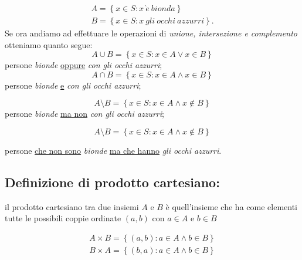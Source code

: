 \documentclass[a4paper]{article}
\begin{document}
	\begin{equation*}
		\begin{array}{l}
			A= \left\lbrace x\in S: x \ \grave e \ bionda \right\rbrace \\
			B= \left\lbrace x\in S: x \ gli \ occhi \ azzurri\right\rbrace.
		\end{array}
	\end{equation*}
Se ora andiamo ad effettuare le operazioni di \textit{unione, intersezione e complemento} otteniamo quanto segue:
\begin{equation*}
		A \cup B = \left\lbrace x \in S : x\in A \lor x \in B\right\rbrace 
\end{equation*}
persone \textit{bionde} \underline{oppure} \textit{con gli occhi azzurri};
\begin{equation*}
		A \cap B = \left\lbrace x \in S : x\in A \wedge x \in B\right\rbrace 
\end{equation*}
persone \textit{bionde} \underline{e} \textit{con gli occhi azzurri};

\begin{equation*}
			A \setminus B = \left\lbrace x \in S : x\in A \wedge x \notin B\right\rbrace 
\end{equation*}
persone \textit{bionde} \underline{ma non} \textit{con gli occhi azzurri};


\begin{equation*}
			A \setminus B = \left\lbrace x \in S : x\in A \wedge x \notin B\right\rbrace 
\end{equation*}

persone \underline{che non sono} \textit{bionde} \underline{ma che hanno} \textit{gli occhi azzurri}.

\subsection{Definizione di prodotto cartesiano:}
il prodotto cartesiano tra due insiemi $A$ e $B$ è quell'insieme che ha come elementi tutte le possibili coppie ordinate $(a,b)$ con $a\in A$ e $b\in B$ 

\begin{equation*}
			\begin{array}{l}
			A \times B=\left\lbrace (a,b):a\in A \wedge b\in B\right\rbrace \\
			B \times A=\left\lbrace (b,a):a\in A \wedge b\in B\right\rbrace 
		\end{array}
\end{equation*}
\end{document}
